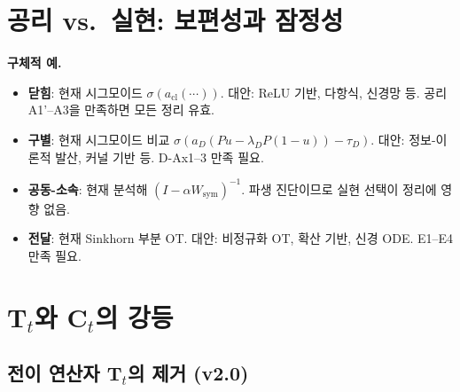 \section{공리 vs.\ 실현: 보편성과 잠정성}
\label{app:cn-axiom-realization}

\begin{center}
\end{center}

\textbf{구체적 예.}
\begin{itemize}
    \item \textbf{닫힘}: 현재 시그모이드 $\sigma(a_{\mathrm{cl}}(\cdots))$. 대안: ReLU 기반, 다항식, 신경망 등. 공리 A1'--A3을 만족하면 모든 정리 유효.
    \item \textbf{구별}: 현재 시그모이드 비교 $\sigma(a_D(Pu - \lambda_D P(1{-}u)) - \tau_D)$. 대안: 정보-이론적 발산, 커널 기반 등. D-Ax1--3 만족 필요.
    \item \textbf{공동-소속}: 현재 분석해 $(I - \alpha W_{\mathrm{sym}})^{-1}$. 파생 진단이므로 실현 선택이 정리에 영향 없음.
    \item \textbf{전달}: 현재 Sinkhorn 부분 OT. 대안: 비정규화 OT, 확산 기반, 신경 ODE. E1--E4 만족 필요.
\end{itemize}


\section{$\mathbf{T}_t$와 $\mathbf{C}_t$의 강등}
\label{app:cn-demotion}

\begin{center}
\end{center}

\subsection{전이 연산자 $\mathbf{T}_t$의 제거 (v2.0)}

